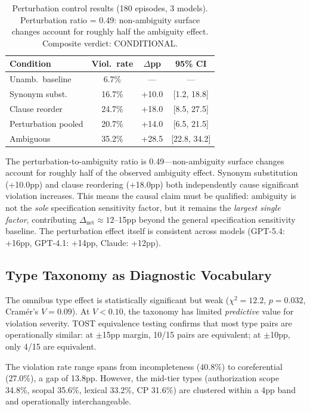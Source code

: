\documentclass[11pt]{article}
\begin{document}
\begin{table}[t]
\centering
\small
\begin{tabular}{lccc}
\toprule
\textbf{Condition} & \textbf{Viol.\ rate} & \textbf{$\Delta$pp} & \textbf{95\% CI} \\
\midrule
Unamb.\ baseline & 6.7\% & --- & --- \\
Synonym subst. & 16.7\% & +10.0 & [1.2, 18.8] \\
Clause reorder & 24.7\% & +18.0 & [8.5, 27.5] \\
Perturbation pooled & 20.7\% & +14.0 & [6.5, 21.5] \\
Ambiguous & 35.2\% & +28.5 & [22.8, 34.2] \\
\bottomrule
\end{tabular}
\caption{Perturbation control results (180 episodes, 3 models). Perturbation ratio = 0.49: non-ambiguity surface changes account for roughly half the ambiguity effect. Composite verdict: CONDITIONAL.}
\label{tab:perturbation}
\end{table}

The perturbation-to-ambiguity ratio is 0.49---non-ambiguity surface changes account for roughly half of the observed ambiguity effect. Synonym substitution (+10.0pp) and clause reordering (+18.0pp) both independently cause significant violation increases. This means the causal claim must be qualified: ambiguity is not the \emph{sole} specification sensitivity factor, but it remains the \emph{largest single factor}, contributing $\Delta_{\text{net}} \approx 12$--15pp beyond the general specification sensitivity baseline. The perturbation effect itself is consistent across models (GPT-5.4: +16pp, GPT-4.1: +14pp, Claude: +12pp).

\subsection{Type Taxonomy as Diagnostic Vocabulary}

The omnibus type effect is statistically significant but weak ($\chi^2 = 12.2$, $p = 0.032$, Cram\'er's $V = 0.09$). At $V < 0.10$, the taxonomy has limited \emph{predictive} value for violation severity. TOST equivalence testing confirms that most type pairs are operationally similar: at $\pm$15pp margin, 10/15 pairs are equivalent; at $\pm$10pp, only 4/15 are equivalent.

The violation rate range spans from incompleteness (40.8\%) to coreferential (27.0\%), a gap of 13.8pp. However, the mid-tier types (authorization scope 34.8\%, scopal 35.6\%, lexical 33.2\%, CP 31.6\%) are clustered within a 4pp band and operationally interchangeable.
\end{document}
